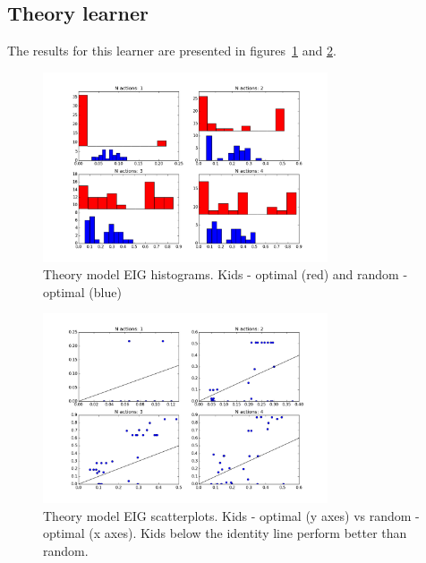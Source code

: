 \documentclass[11pt, a4paper]{article}
\begin{document}
\subsection*{Theory learner}
The results for this learner are presented in figures~\ref{fig:th} and \ref{fig:ts}.%

\begin{figure}[h!]
\begin{center}
\includegraphics[width=0.75\textwidth]{../Plots/IG_theory_hist.png}
\end{center}
\caption{Theory model EIG histograms. Kids - optimal (red) and random - optimal (blue)}
\label{fig:th}
\end{figure}

\begin{figure}[h!]
\begin{center}
\includegraphics[width=0.75\textwidth]{../Plots/IG_theory_scat.png}
\end{center}
\caption{Theory model EIG scatterplots. Kids - optimal (y axes) vs random - optimal (x axes). Kids below the identity line perform better than random.}
\label{fig:ts}
\end{figure}
\end{document}
